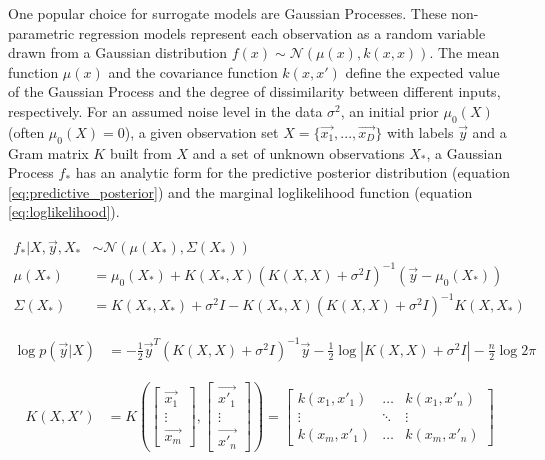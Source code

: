 \documentclass{IOS-Book-Article}
\begin{document}
	One popular choice for surrogate models are Gaussian Processes\cite{gaussian-processes}. These non-parametric regression models represent each observation as a random variable drawn from a Gaussian distribution $f(x) \sim \mathcal{N}(\mu(x), k(x,x))$. The mean function $\mu(x)$ and the covariance function $k(x,x')$ define the expected value of the Gaussian Process and the degree of dissimilarity between different inputs, respectively. For an assumed noise level in the data $\sigma^2$, an initial prior $\mu_0(X)$ (often $\mu_0(X)=0$), a given observation set $X=\{\vec{x_1}, ..., \vec{x_D}\}$ with labels $\vec{y}$ and a Gram matrix $K$ built from $X$ and a set of unknown observations $X_*$, a Gaussian Process $f_*$ has an analytic form for the predictive posterior distribution (equation \ref{eq:predictive_posterior}) and the marginal loglikelihood function (equation \ref{eq:loglikelihood}).
	
	\begin{equation} \label{eq:predictive_posterior}
		\begin{aligned}
			f_*|X,\vec{y},X_* & \sim \mathcal{N}(\mu(X_*), \Sigma(X_*)) \\
			\mu(X_*) & = \mu_0(X_*) + K(X_*,X)(K(X,X) + \sigma^2 I)^{-1}(\vec{y} - \mu_0(X_*)) \\
			\Sigma(X_*) & = K(X_*,X_*) + \sigma^2 I - K(X_*,X)(K(X,X) + \sigma^2 I)^{-1} K(X,X_*)
		\end{aligned}
	\end{equation}
	
	\begin{equation} \label{eq:loglikelihood}
		\begin{aligned}
			\log{p(\vec{y}|X)} &= -\frac{1}{2}\vec{y}^T (K(X,X) + \sigma^2 I)^{-1}\vec{y} - \frac{1}{2}\log{|K(X,X) + \sigma^2 I|} - \frac{n}{2}\log{2\pi}
		\end{aligned}
	\end{equation}
	
	\begin{equation}
		\begin{aligned}
			K(X,X') &= K\left(\begin{bmatrix} \vec{x_1} \\ \vdots \\ \vec{x_m} \end{bmatrix}, \begin{bmatrix} \vec{x'_1} \\ \vdots \\ \vec{x'_n} \end{bmatrix}\right) = \begin{bmatrix} 
				k(x_1,x'_1) & \dots  & k(x_1,x'_n)\\
				\vdots & \ddots & \vdots\\
				k(x_m,x'_1) & \dots  & k(x_m,x'_n)
			\end{bmatrix}
		\end{aligned}
	\end{equation}
	
\end{document}
